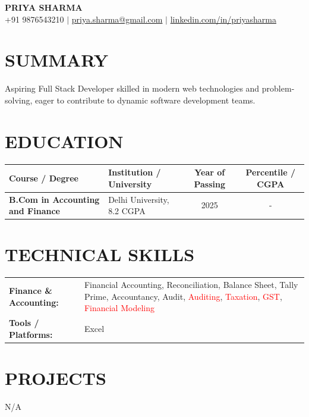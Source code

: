 \documentclass[8.5pt,a4paper]{extarticle}
\begin{document}
\begin{center}
{\large \textbf{PRIYA SHARMA}} \\ \vspace{1pt}
{\footnotesize +91 9876543210 \quad $|$ \quad \href{mailto:priya.sharma@gmail.com}{priya.sharma@gmail.com} \quad $|$ \quad \href{https://linkedin.com/in/priyasharma}{linkedin.com/in/priyasharma}}
\end{center}

\section*{SUMMARY}
{\small Aspiring Full Stack Developer skilled in modern web technologies and problem-solving, eager to contribute to dynamic software development teams.}

\section*{EDUCATION}
{\small {\small
\renewcommand{\arraystretch}{1.18}
\noindent\begin{tabularx}{\textwidth}{|p{1.7in}|X|c|c|}
\hline
\textbf{Course / Degree} & \textbf{Institution / University} & \textbf{Year of Passing} & \textbf{Percentile / CGPA} \\ \hline
\textbf{B.Com in Accounting and Finance} & Delhi University, 8.2 CGPA & 2025 & - \\ \hline
\end{tabularx}
}\vspace{4pt}

}
\section*{TECHNICAL SKILLS}
\small
\begin{tabular}{@{}p{2.2in}p{5.1in}@{}}
\textbf{Finance \& Accounting:} & Financial Accounting, Reconciliation, Balance Sheet, Tally Prime, Accountancy, Audit, \textcolor{red}{Auditing}, \textcolor{red}{Taxation}, \textcolor{red}{GST}, \textcolor{red}{Financial Modeling} \\
\textbf{Tools / Platforms:} & Excel \\
\end{tabular}



\section*{PROJECTS}
{\small N/A

}
\end{document}
